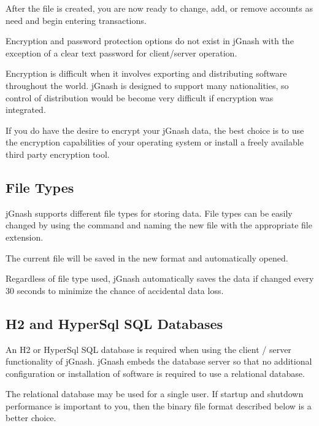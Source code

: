 \documentclass[letterpaper,12pt]{book}
\begin{document}
    After the file is created, you are now ready to change, add, or remove accounts as need and begin entering transactions.

    \begin{mdframed}[style=info]
        Encryption and password protection options do not exist in jGnash with the exception of a clear text password
        for client/server operation.

        Encryption is difficult when it involves exporting and distributing software throughout the world.
        jGnash is designed to support many nationalities, so control of distribution would be become very difficult if
        encryption was integrated.

        If you do have the desire to encrypt your jGnash data, the best choice is to use the encryption capabilities
        of your operating system or
        install a freely available third party encryption tool.
    \end{mdframed}

    \subsection{File Types}
    \label{subsec:fileTypes}
    jGnash supports different file types for storing data.
    File types can be easily changed by using the  command and naming the new file with the
    appropriate file extension.

    The current file will be saved in the new format and automatically opened.

    Regardless of file type used, jGnash automatically saves the data if changed every 30 seconds to minimize the
    chance of accidental data loss.


    \subsection{H2 and HyperSql SQL Databases}\label{subsec:h2-and-hypersql-sql-databases}
    An H2 or HyperSql SQL database is required when using the client / server functionality of jGnash.
    jGnash embeds the database server so that no additional configuration or installation of software is required
    to use a relational database.

    The relational database may be used for a single user.
    If startup and shutdown performance is important to you, then the binary file format described below is a better choice.
\end{document}
